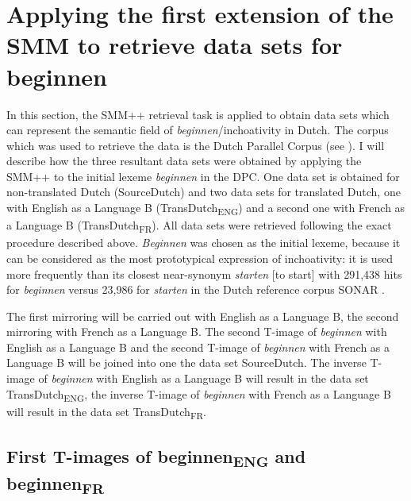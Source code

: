 \section{\label{sec:3.6}  Applying the first extension of the SMM to retrieve data sets for beginnen}

In this section, the SMM++ retrieval task is applied to obtain data sets which can represent the semantic field of \textit{beginnen}/inchoativity in Dutch. The corpus which was used to retrieve the data is the Dutch Parallel Corpus (see ). I will describe how the three resultant data sets were obtained by applying the SMM++ to the initial lexeme \textit{beginnen} in the DPC. One data set is obtained for non-translated Dutch (SourceDutch) and two data sets for translated Dutch, one with English as a Language B (TransDutch\textsubscript{ENG}) and a second one with French as a Language B (TransDutch\textsubscript{FR}). All data sets were retrieved following the exact procedure described above. \textit{Beginnen} was chosen as the initial lexeme, because it can be considered as the most prototypical expression of inchoativity: it is used more frequently than its closest near-synonym \textit{starten} [to start] with 291,438 hits for \textit{beginnen} versus 23,986 for \textit{starten} in the Dutch reference corpus SONAR \citep{spyns_construction_2013}.



The first mirroring will be carried out with English as a Language B, the second mirroring with French as a Language B. The second T-image of \textit{beginnen} with English as a Language B and the second T-image of \textit{beginnen} with French as a Language B will be joined into one the data set SourceDutch. The inverse T-image of \textit{beginnen} with English as a Language B will result in the data set TransDutch\textsubscript{ENG}, the inverse T-image of \textit{beginnen} with French as a Language B will result in the data set TransDutch\textsubscript{FR}.


\subsection{\label{sec:3.6.1}  First T-images of beginnen\textsubscript{ENG}\textsubscript{} and beginnen\textsubscript{FR}}\footnotemark{}


